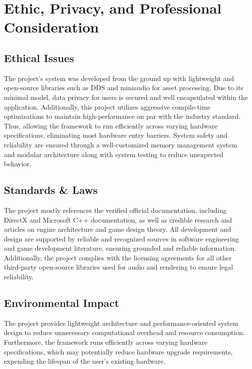 \section{Ethic, Privacy, and Professional Consideration}
\label{sec:ethic-privacy-and-professional-consideration}

\subsection{Ethical Issues}
\label{subsec:ethical-issues}

The project's system was developed from the ground up with lightweight and open-source libraries such as DDS and miniaudio for asset processing.
Due to its minimal model, data privacy for users is secured and well encapsulated within the application.
Additionally, this project utilizes aggressive compile-time optimizations to maintain high-performance on par with
the industry standard.
Thus, allowing the framework to run efficiently across varying hardware specifications, eliminating most hardware entry barriers.
System safety and reliability are ensured through a well-customized memory management system and modular architecture
along with system testing to reduce unexpected behavior.


\subsection{Standards \& Laws}
\label{subsec:standards-&-laws}

The project mostly references the verified official documentation, including DirectX and Microsoft C++ documentation,
as well as credible research and articles on engine architecture and game design theory.
All development and design are supported by reliable and recognized sources in software engineering
and game development literature, ensuring grounded and reliable information.
Additionally, the project complies with the licensing agreements for all other third-party open-source libraries
used for audio and rendering to ensure legal reliability.

\subsection{Environmental Impact}
\label{subsec:environmental-impact}
The project provides lightweight architecture and performance-oriented system design
to reduce unnecessary computational overhead and resource consumption.
Furthermore, the framework runs efficiently across varying hardware specifications, which may potentially
reduce hardware upgrade requirements, expending the lifespan of the user's existing hardware.


